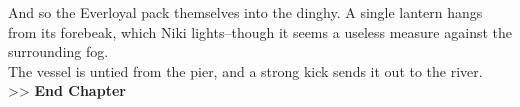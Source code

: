 And so the Everloyal pack themselves into the dinghy. A single lantern hangs from its forebeak, which Niki lights--though it seems a useless measure against the surrounding fog.\\

The vessel is untied from the pier, and a strong kick sends it out to the river.\\

>> \textbf{End Chapter}